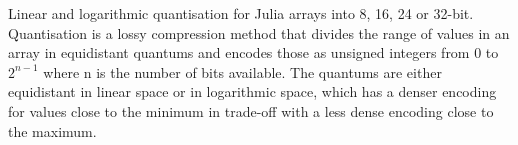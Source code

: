 Linear and logarithmic quantisation for Julia arrays into 8, 16, 24 or 32-bit. Quantisation is a lossy compression method that divides the range of values in an array
in equidistant quantums and encodes those as unsigned integers from $0$ to $2^{n-1}$ where n is the number of bits available. The quantums are either equidistant
in linear space or in logarithmic space, which has a denser encoding for values close to the minimum in trade-off with a less dense encoding close to the maximum.
